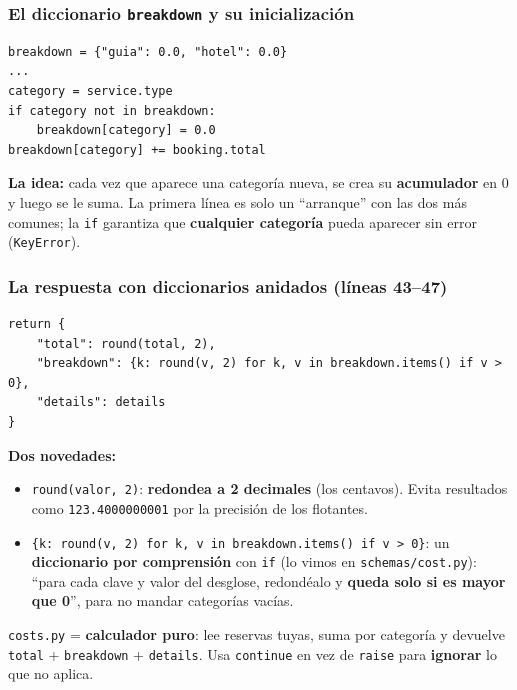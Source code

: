 \documentclass[11pt,a4paper]{article}
\begin{document}
\subsubsection{El diccionario \texttt{breakdown} y su inicialización}

\begin{lstlisting}
breakdown = {"guia": 0.0, "hotel": 0.0}
...
category = service.type
if category not in breakdown:
    breakdown[category] = 0.0
breakdown[category] += booking.total
\end{lstlisting}

\textbf{La idea:} cada vez que aparece una categoría nueva, se crea su \textbf{acumulador} en 0
y luego se le suma. La primera línea es solo un ``arranque'' con las dos más comunes; la
\texttt{if} garantiza que \textbf{cualquier categoría} pueda aparecer sin error
(\texttt{KeyError}).

\subsubsection{La respuesta con diccionarios anidados (líneas 43--47)}

\begin{lstlisting}
return {
    "total": round(total, 2),
    "breakdown": {k: round(v, 2) for k, v in breakdown.items() if v > 0},
    "details": details
}
\end{lstlisting}

\textbf{Dos novedades:}
\begin{itemize}
    \item \texttt{round(valor, 2)}: \textbf{redondea a 2 decimales} (los centavos). Evita
    resultados como \texttt{123.4000000001} por la precisión de los flotantes.
    \item \texttt{\{k: round(v, 2) for k, v in breakdown.items() if v > 0\}}: un
    \textbf{diccionario por comprensión} con \texttt{if} (lo vimos en \texttt{schemas/cost.py}):
    ``para cada clave y valor del desglose, redondéalo y \textbf{queda solo si es mayor que 0}'',
    para no mandar categorías vacías.
\end{itemize}

\begin{recuadro}
\texttt{costs.py} = \textbf{calculador puro}: lee reservas tuyas, suma por categoría y devuelve
\texttt{total} + \texttt{breakdown} + \texttt{details}. Usa \texttt{continue} en vez de
\texttt{raise} para \textbf{ignorar} lo que no aplica.
\end{recuadro}
\end{document}
